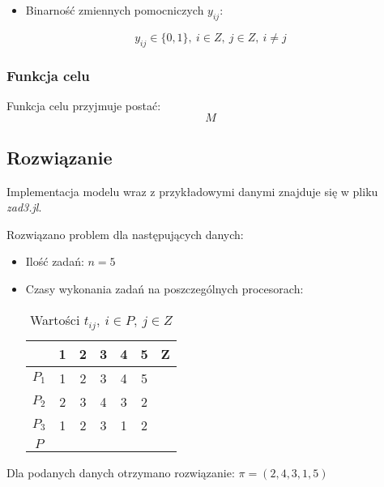 \documentclass{article}
\begin{document}
        \begin{itemize}
            \item Binarność zmiennych pomocniczych $y_{ij}$:
        \end{itemize}
                $$y_{ij} \in \{0, 1\},\ i \in Z,\ j \in Z,\ i \neq j$$

    \subsubsection{Funkcja celu}

        Funkcja celu przyjmuje postać: 
        $$M$$

    \subsection{Rozwiązanie}
    
    Implementacja modelu wraz z przykładowymi danymi znajduje się w pliku \textit{zad3.jl}.

    Rozwiązano problem dla następujących danych:

    \begin{itemize}
        \item Ilość zadań: $n = 5$
        \item Czasy wykonania zadań na poszczególnych procesorach:
            \begin{table}[H]
                \begin{center}
                    \begin{tabular}{c||c|c|c|c|c||c}
                         & \textbf{1} & \textbf{2} & \textbf{3} & \textbf{4} & \textbf{5} & \textbf{Z} \\ 
                        \hline
                        \hline
                        \textbf{$P_1$} & 1 & 2 & 3 & 4 & 5 &  \\
                        \hline
                        \textbf{$P_2$} & 2 & 3 & 4 & 3 & 2 &  \\
                        \hline
                        \textbf{$P_3$} & 1 & 2 & 3 & 1 & 2 &  \\
                        \hline
                        \hline
                        \textbf{$P$} &  &  &  &  &  &  \\
                    \end{tabular}
                    \caption{Wartości $t_{ij},\ i \in P,\ j \in Z$}
                    \label{tab4}
                \end{center}
            \end{table}
    \end{itemize}

    Dla podanych danych otrzymano rozwiązanie:
    $\pi = (2, 4, 3, 1, 5)$
\end{document}

